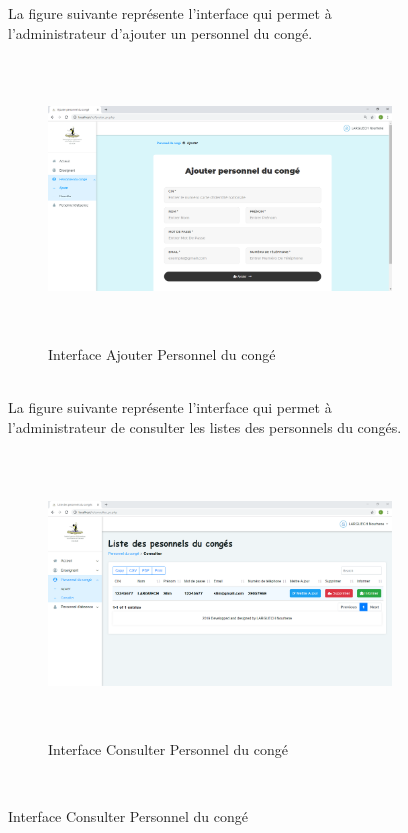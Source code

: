 \documentclass[12 pt]{report}
\begin{document}
\begin{figure}[h]
\begin{center}
La figure suivante représente l'interface qui permet à l'administrateur d'ajouter  un personnel du congé.
\begin{figure}[h]
 \begin{center}
\includegraphics[width= 18 cm ,height=  7.5cm]{ajouter_pc.PNG}
\caption{Interface Ajouter Personnel du congé}

\end{center}
\end{figure}\\

La figure suivante représente l'interface qui permet à l'administrateur de consulter les listes des personnels du congés.
\begin{figure}[h]
 \begin{center}
\includegraphics[width= 18 cm ,height=  7.5cm]{consulter_pc.PNG}
\caption{Interface Consulter Personnel du congé}

\end{center}
\end{figure}\\


\end{center}
\end{figure}
\end{document}

